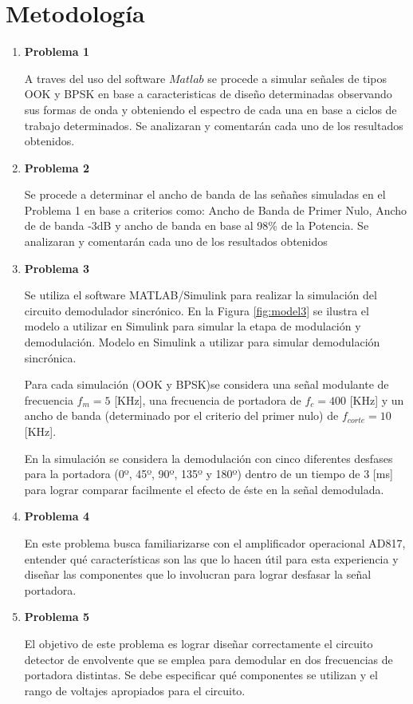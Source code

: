\documentclass[letterpaper, titlepage]{article}
\begin{document}
\section{Metodología}
	\begin{enumerate}
		\item \textbf{Problema 1}
		
			A traves del uso del software $Matlab$ se procede a simular señales de tipos OOK y BPSK en base a caracteristicas de diseño determinadas observando sus formas de onda y obteniendo el espectro de cada una en base a ciclos de trabajo determinados. Se  analizaran y comentarán cada uno de  los resultados obtenidos.
		\item \textbf{Problema 2}
		
			Se procede a determinar el ancho de banda de las señañes simuladas en el Problema 1 en base a criterios como: Ancho de Banda de Primer Nulo, Ancho de de banda -3dB y ancho de banda en base al 98\% de la Potencia. Se  analizaran y comentarán cada uno de  los resultados obtenidos
		\item \textbf{Problema 3}
		
			Se utiliza el software MATLAB/Simulink para realizar la simulación del circuito demodulador sincrónico. En la Figura \ref{fig:model3} se ilustra el modelo a utilizar en Simulink para simular la etapa de modulación y demodulación.
			{Modelo en Simulink a utilizar para simular demodulación sincrónica.}
			
			Para cada simulación (OOK y BPSK)se considera una señal modulante de frecuencia $f_m=5$ [KHz], una frecuencia de portadora de $f_c=400$ [KHz] y un ancho de banda (determinado por el criterio del primer nulo) de $f_{corte}=10$ [KHz].
			
			En la simulación se considera la demodulación con cinco diferentes desfases para la portadora (0º, 45º, 90º, 135º y 180º) dentro de un tiempo de $3$ [ms] para lograr comparar facilmente el efecto de éste en la señal demodulada.
			
		\item \textbf{Problema 4}
		
		En este problema busca familiarizarse con el amplificador operacional AD817, entender qué características son las que lo hacen útil para esta experiencia y diseñar las componentes que lo involucran para lograr desfasar la señal portadora.
		\item \textbf{Problema 5}
		
		El objetivo de este problema es lograr diseñar correctamente el circuito detector de envolvente que se emplea para demodular en dos frecuencias de portadora distintas. Se debe especificar qué componentes se utilizan y el rango de voltajes apropiados para el circuito.
	\end{enumerate}
\newpage
\newpage
\end{document}
